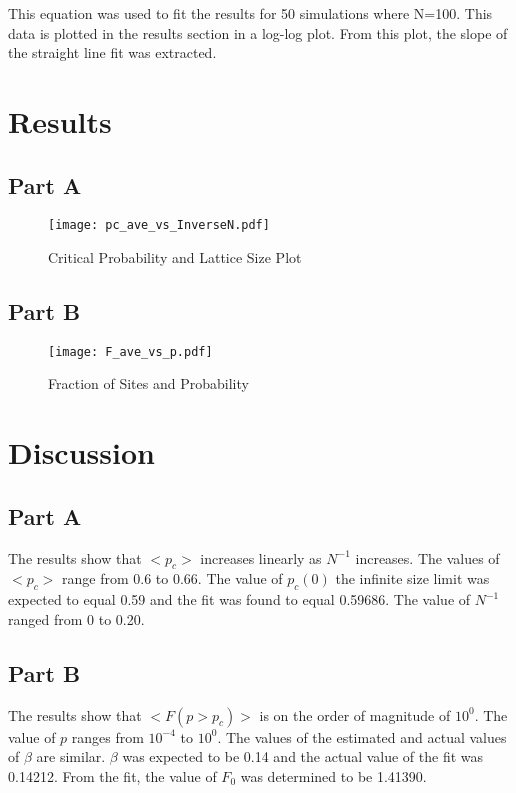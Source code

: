 \documentclass[12pt]{article}
\begin{document}
\indent This equation was used to fit the results for 50 simulations where N=100. This data is plotted in the results section in a log-log plot. From this plot, the slope of the straight line fit was extracted.

\section{Results}

\subsection{Part A}

\begin{figure}[!htbc]
	\texttt{[image: pc\_ave\_vs\_InverseN.pdf]}
		\caption{Critical Probability and Lattice Size Plot}
		\label{fig:1}
\end{figure}

\subsection{Part B}

\begin{figure}[!htbc]
	\texttt{[image: F\_ave\_vs\_p.pdf]}
	\caption{Fraction of Sites and Probability}
	\label{fig:2}
\end{figure}

\section{Discussion}

\subsection{Part A}
\indent \indent The results show that $<p_c>$ increases linearly as $N^{-1}$ increases. The values of $<p_c>$ range from 0.6 to 0.66. The value of $p_c(0)$ the infinite size limit was expected to equal 0.59 and the fit was found to equal 0.59686. The value of $N^{-1}$ ranged from 0 to 0.20.

\subsection{Part B}
\indent \indent The results show that $<F(p>p_c)>$ is on the order of magnitude of $10^0$. The value of $p$ ranges from $10^{-4}$ to $10^0$. The values of the estimated and actual values of $\beta$ are similar. $\beta$ was expected to be 0.14 and the actual value of the fit was 0.14212. From the fit, the value of $F_0$ was determined to be 1.41390.
\end{document}
